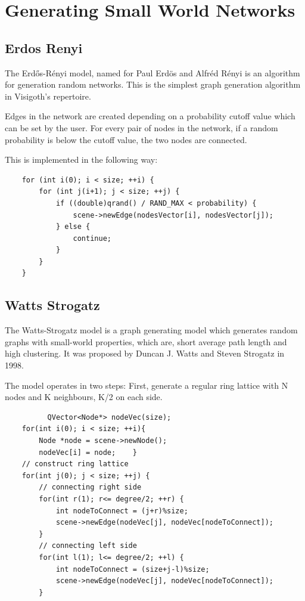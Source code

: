 \documentclass[a4paper,11pt,titlepage]{article}
\let\stdsection\section         %
\renewcommand{\section}{\newpage\stdsection}
\begin{document}

\section{Generating Small World Networks}

\subsection{Erdos Renyi}

The Erd\H{o}s-R\'{e}nyi model, named for Paul Erd\"{o}s and Alfr\'{e}d R\'{e}nyi is an algorithm for
generation random networks. This is the simplest graph generation algorithm in
Visigoth's repertoire.

Edges in the network are created depending on a probability cutoff value which
can be set by the user. For every pair of nodes in the network, if a random
probability is below the cutoff value, the two nodes are connected.

This is implemented in the following way:
\begin{lstlisting}
    for (int i(0); i < size; ++i) {
        for (int j(i+1); j < size; ++j) {
            if ((double)qrand() / RAND_MAX < probability) {
                scene->newEdge(nodesVector[i], nodesVector[j]);
            } else {
                continue;
            }
        }
    }
\end{lstlisting}
\subsection{Watts Strogatz}

The Watts-Strogatz model is a graph generating model which generates random
graphs with small-world properties, which are, short average path length and
high clustering. It was proposed by Duncan J. Watts and Steven Strogatz in 1998.

The model operates in two steps:
First, generate a regular ring lattice with N nodes and K neighbours, K/2 on
each side.
\begin{lstlisting}
          QVector<Node*> nodeVec(size);
    for(int i(0); i < size; ++i){
        Node *node = scene->newNode();
        nodeVec[i] = node;    }
    // construct ring lattice
    for(int j(0); j < size; ++j) {
        // connecting right side
        for(int r(1); r<= degree/2; ++r) {
            int nodeToConnect = (j+r)%size;
            scene->newEdge(nodeVec[j], nodeVec[nodeToConnect]);
        }
        // connecting left side
        for(int l(1); l<= degree/2; ++l) {
            int nodeToConnect = (size+j-l)%size;
            scene->newEdge(nodeVec[j], nodeVec[nodeToConnect]);
        }
\end{lstlisting}
\end{document}
